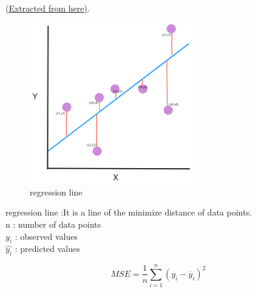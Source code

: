 \documentclass[14pt,a4paper]{report}  %
\begin{document}
\begin{itemize}
(\href{https://www.statisticshowto.com/mean-squared-error/}{\underline{Extracted from here)}}.\\[6pt]
\begin{figure}
\center
\includegraphics[height=7cm]{MSE}
\caption{regression line}
\end{figure}

regression line :It is a line of the minimize distance of data points. \\
n : number of data points\\
$y_i$ :  observed values\\
$\hat{y_i}$ : predicted values\\
\begin{Large}
$$MSE=\frac{1}{n} \sum_{i=1}^n(y_i-\overline{y} _i)^2$$
\end{Large}\\[6pt]
\newpage
\end{itemize}
\end{document}
